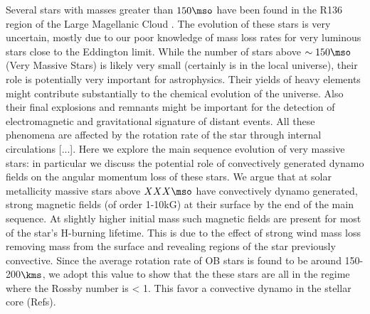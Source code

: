 Several stars with masses greater than $150\mso$ have been found in the R136 region of the Large Magellanic Cloud  \cite{sof_Parker_Goodwin_Kassim_2010}. The evolution of these stars is very uncertain, mostly due to our poor knowledge of mass loss rates for very luminous stars close to the Eddington limit. While the number of stars above $\sim 150\mso$ (Very Massive Stars) is likely very small (certainly is in the local universe), their role is potentially very important for astrophysics. Their yields of heavy elements might contribute substantially to the chemical evolution of the universe. Also their final explosions and remnants might be important for the detection of electromagnetic and gravitational signature of distant events. All these phenomena are affected by the rotation rate of the star through internal circulations [...]. Here we explore the main sequence evolution of very massive stars: in particular we discuss the potential role of convectively generated dynamo fields on the angular momentum loss of these stars. We argue that at solar metallicity massive stars above $XXX\mso$ have convectively dynamo generated, strong magnetic fields (of order 1-10kG) at their surface by the end of the main sequence. At slightly higher initial mass such magnetic fields are present for most of the star's H-burning lifetime. This is due to the effect of strong wind mass loss removing mass from the surface and revealing regions of the star previously convective. Since the average rotation rate of OB stars is found to be around 150-200$\kms$, we adopt this value to show that the these stars are all in the regime where the Rossby number is < 1. This favor a convective dynamo in the stellar core (Refs). 